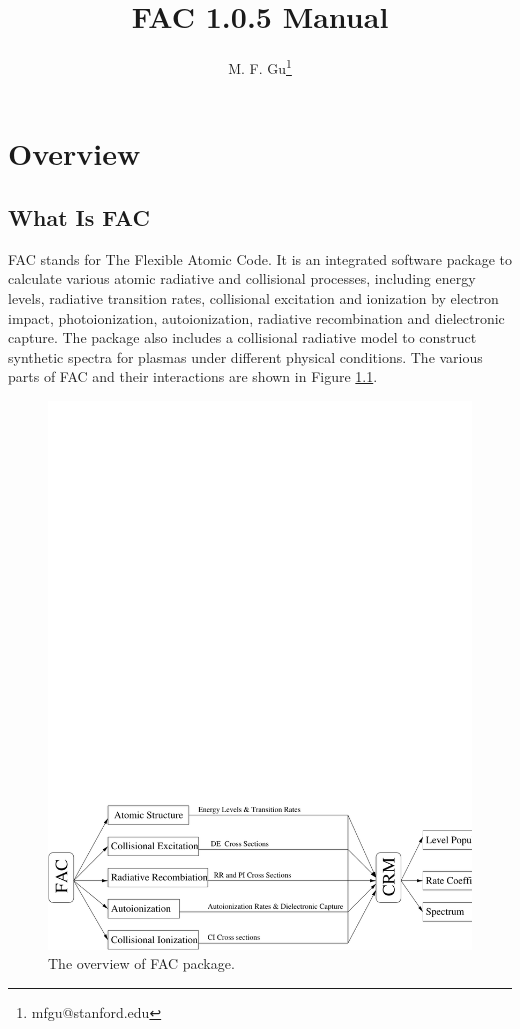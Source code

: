 \documentclass[twoside,letterpaper]{refrep}
\newcommand{\facversion}{{1.0.5}\xspace}
\begin{document}
\title{FAC \facversion Manual}
\author{M. F. Gu\thanks{mfgu@stanford.edu}}

\date{}

\maketitle

\tableofcontents

\chapter{Overview}
\label{cha:overview}

\section{What Is FAC}
FAC stands for The Flexible Atomic Code. It is an
integrated software package to calculate various atomic radiative and
collisional processes, including energy levels, radiative transition rates,
collisional excitation and 
ionization by electron impact, photoionization, autoionization, radiative
recombination and dielectronic capture. The package also includes a
collisional radiative model to construct synthetic spectra for plasmas under
different physical conditions. The various parts of FAC and their
interactions are shown in Figure \ref{fig:flow}. 

\begin{figure}
\includegraphics[width=6in,bb=0 0 655 209]{flow.pdf}
\caption{\label{fig:flow}The overview of FAC package.}
\end{figure}
\end{document}
